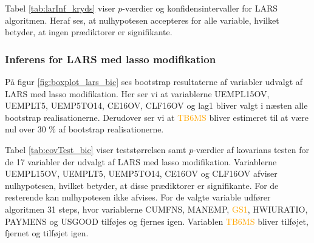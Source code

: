 Tabel \ref{tab:larInf_kryds} viser \(p\)-værdier og konfidensintervaller for LARS algoritmen. 
Heraf ses, at nulhypotesen accepteres for alle variable, hvilket betyder, at ingen prædiktorer er signifikante.



\subsubsection{Inferens for LARS med lasso modifikation}
På figur \ref{fig:boxplot_lars_bic} ses bootstrap resultaterne af variabler udvalgt af LARS med lasso modifikation. 
Her ser vi at variablerne \textcolor{blue3}{UEMPL15OV}, \textcolor{blue3}{UEMPLT5}, \textcolor{blue3}{UEMP5TO14}, \textcolor{blue3}{CE16OV}, \textcolor{blue3}{CLF16OV} og \textcolor{blue3}{lag1} bliver valgt i næsten alle bootstrap realisationerne. Derudover ser vi at \textcolor{orange}{TB6MS} bliver estimeret til at være nul over 30 \% af bootstrap realisationerne. 

Tabel \ref{tab:covTest_bic} viser teststørrelsen samt $p$-værdier af kovarians testen for de 17 variabler der udvalgt af LARS med lasso modifikation. Variablerne  \textcolor{blue3}{UEMPL15OV}, \textcolor{blue3}{UEMPLT5}, \textcolor{blue3}{UEMP5TO14}, \textcolor{blue3}{CE16OV} og \textcolor{blue3}{CLF16OV} afviser nulhypotesen, hvilket betyder, at disse prædiktorer er signifikante. For de resterende kan nulhypotesen ikke afvises. 
For de valgte variable udfører algoritmen 31 steps, hvor variablerne \textcolor{chartreuse4}{CUMFNS}, \textcolor{blue3}{MANEMP}, \textcolor{orange}{GS1}, \textcolor{blue3}{HWIURATIO}, \textcolor{blue3}{PAYMENS} og \textcolor{blue3}{USGOOD} tilføjes og fjernes igen. 
Variablen \textcolor{orange}{TB6MS} bliver tilføjet, fjernet og tilføjet igen. 





